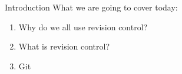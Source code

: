 \begin{frame}{Introduction}
    What we are going to cover today:
    \begin{enumerate}
        \item Why do we all use revision control?
        \item What is revision control?
        \item Git
    \end{enumerate}
\end{frame}
